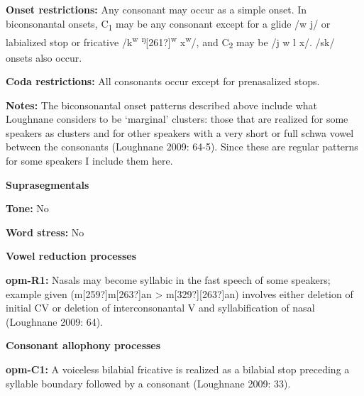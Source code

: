 \begin{styleBody}
\textbf{Onset restrictions: }Any consonant may occur as a simple onset. In biconsonantal onsets, C\textsubscript{1} may be any consonant except for a glide /w j/ or labialized stop or fricative /k\textsuperscript{w} \textsuperscript{ŋ}[261?]\textsuperscript{w} x\textsuperscript{w}/, and C\textsubscript{2} may be /j w l x/. /sk/ onsets also occur.
\end{styleBody}

\begin{styleBody}
\textbf{Coda restrictions: }All consonants occur except for prenasalized stops.
\end{styleBody}

\begin{styleBody}
\textbf{Notes: }The biconsonantal onset patterns described above include what Loughnane considers to be ‘marginal’ clusters: those that are realized for some speakers as clusters and for other speakers with a very short or full schwa vowel between the consonants (Loughnane 2009: 64-5). Since these are regular patterns for some speakers I include them here.
\end{styleBody}

\begin{styleBody}
\textbf{Suprasegmentals}
\end{styleBody}

\begin{styleBody}
\textbf{Tone:} No
\end{styleBody}

\begin{styleBody}
\textbf{Word stress:} No
\end{styleBody}

\begin{styleBody}
\textbf{Vowel reduction processes}
\end{styleBody}

\begin{styleBody}
\textbf{opm-R1:} Nasals may become syllabic in the fast speech of some speakers; example given (m[259?]m[263?]an {\textgreater} m[329?][263?]an) involves either deletion of initial CV or deletion of interconsonantal V and syllabification of nasal (Loughnane 2009: 64).
\end{styleBody}

\begin{styleBody}
\textbf{Consonant allophony processes}
\end{styleBody}

\begin{styleBody}
\textbf{opm-C1: }A voiceless bilabial fricative is realized as a bilabial stop preceding a syllable boundary followed by a consonant (Loughnane 2009: 33).
\end{styleBody}

